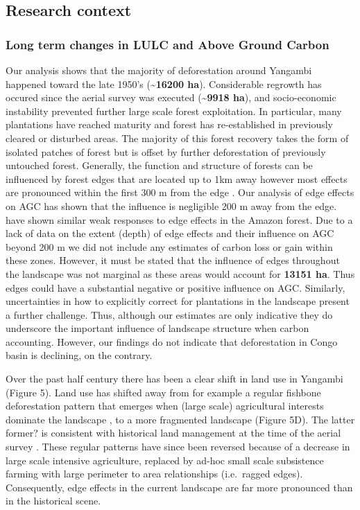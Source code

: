 \documentclass[remote sensing,article,submit,moreauthors,pdftex]{mdpi}
\begin{document}
\hypertarget{research-context}{%
\subsection{Research context}\label{research-context}}

\hypertarget{long-term-changes-in-lulc-and-above-ground-carbon-1}{%
\subsubsection{Long term changes in LULC and Above Ground
Carbon}\label{long-term-changes-in-lulc-and-above-ground-carbon-1}}

Our analysis shows that the majority of deforestation around Yangambi
happened toward the late 1950's (\textbf{\textasciitilde{}16200 ha}).
Considerable regrowth has occured since the aerial survey was executed
(\textbf{\textasciitilde{}9918 ha}), and socio-economic instability
prevented further large scale forest exploitation. In particular, many
plantations have reached maturity and forest has re-established in
previously cleared or disturbed areas. The majority of this forest
recovery takes the form of isolated patches of forest but is offset by
further deforestation of previously untouched forest. Generally, the
function and structure of forests can be influenced by forest edges that
are located up to 1km away however most effects are pronounced within
the first 300 m from the edge \citep{gascon2000}. Our analysis of edge
effects on AGC has shown that the influence is negligible 200 m away
from the edge. \citet{phillips2006} have shown similar weak responses to
edge effects in the Amazon forest. Due to a lack of data on the extent
(depth) of edge effects and their influence on AGC beyond 200 m we did
not include any estimates of carbon loss or gain within these zones.
However, it must be stated that the influence of edges throughout the
landscape was not marginal as these areas would account for
\textbf{13151 ha}. Thus edges could have a substantial negative
\citep{brinck2017} or positive \citep{reinmann2017} influence on AGC.
Similarly, uncertainties in how to explicitly correct for plantations in
the landscape present a further challenge. Thus, although our estimates
are only indicative they do underscore the important influence of
landscape structure when carbon accounting. However, our findings do not
indicate that deforestation in Congo basin is declining, on the
contrary.

Over the past half century there has been a clear shift in land use in
Yangambi (Figure 5). Land use has shifted away from for example a
regular fishbone deforestation pattern that emerges when (large scale)
agricultural interests dominate the landscape \citep{arima2015}, to a
more fragmented landscape (Figure 5D). The latter former? is consistent
with historical land management at the time of the aerial survey
\citep{bustillo2018}. These regular patterns have since been reversed
because of a decrease in large scale intensive agriculture, replaced by
ad-hoc small scale subsistence farming with large perimeter to area
relationships (i.e.~ragged edges). Consequently, edge effects in the
current landscape are far more pronounced than in the historical scene.
\end{document}
